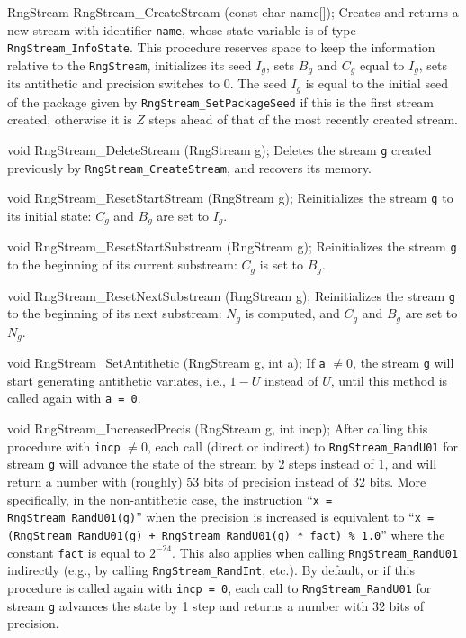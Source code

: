 \documentclass[12pt]{article}
\begin{document}
RngStream RngStream_CreateStream (const char name[]);
\endcode
 \tab Creates and returns a new stream with identifier {\tt name},
   whose state variable is of type {\tt RngStream\_InfoState}.
   This procedure reserves space to keep the information relative to
   the {\tt RngStream}, initializes its seed $I_g$,
   sets $B_g$ and $C_g$ equal to $I_g$, sets its antithetic and precision
   switches to 0.
   The seed $I_g$ is equal to the initial seed of the package given by 
   {\tt RngStream\_SetPackageSeed} if this is the first stream created,
   otherwise it is $Z$ steps ahead of that of the most recently
   created stream.
 \endtab
\code

void RngStream_DeleteStream (RngStream g);
\endcode
 \tab Deletes the stream {\tt g} created previously 
  by {\tt RngStream\_CreateStream}, and recovers its memory.
 \endtab
\code

void RngStream_ResetStartStream (RngStream g);
\endcode
 \tab Reinitializes the stream {\tt g} to its initial state:
   $C_g$ and $B_g$ are set to $I_g$.
 \endtab
\code

void RngStream_ResetStartSubstream (RngStream g);
\endcode
 \tab Reinitializes the stream {\tt g} to the beginning of its current
   substream: $C_g$ is set to $B_g$.
 \endtab
\code

void RngStream_ResetNextSubstream (RngStream g);
\endcode
 \tab Reinitializes the stream {\tt g} to the beginning of its next
   substream: $N_g$ is computed, and
   $C_g$ and $B_g$ are set to $N_g$.
 \endtab
\code

void RngStream_SetAntithetic (RngStream g, int a);
\endcode
 \tab  If {\tt a} $\neq 0$, the stream {\tt g} will start generating 
 antithetic variates, i.e., $1-U$ instead of $U$, until this method is
 called again with {\tt a = 0}.
 \endtab
\code

void RngStream_IncreasedPrecis (RngStream g, int incp);
\endcode
 \tab After calling this procedure with {\tt incp} $\neq 0$, each call
  (direct or indirect) to {\tt RngStream\_RandU01} for stream {\tt g}
  will advance the state of the stream by 2 steps instead of 1, and will 
  return a number with (roughly) 53 bits of precision instead of 32 bits.
  More specifically, in the non-antithetic case, the instruction
  ``{\tt x = RngStream\_RandU01(g)}'' when the precision is increased 
  is equivalent to
  ``{\tt x = (RngStream\_RandU01(g) + RngStream\_RandU01(g) * fact) \%\ 1.0}'' 
  where the constant {\tt fact} is equal to $2^{-24}$.
  This also applies when calling {\tt RngStream\_RandU01} indirectly
  (e.g., by calling {\tt RngStream\_RandInt}, etc.).
  By default, or if this procedure is called again with {\tt incp = 0}, 
  each call to {\tt RngStream\_RandU01} for stream {\tt g} 
   advances the state by 1 step and returns a 
  number with 32 bits of precision.
 \endtab
\code
\end{document}
